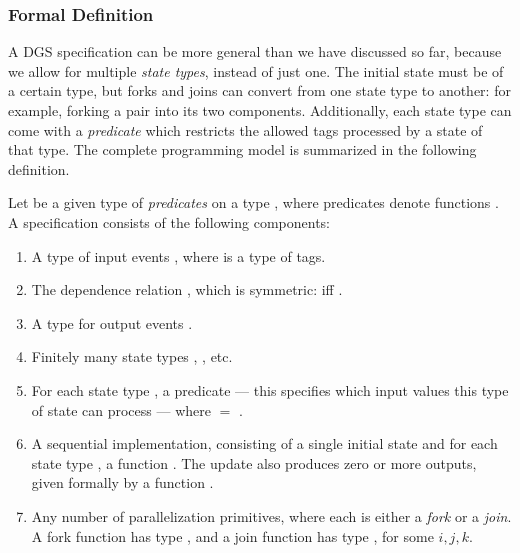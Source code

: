 \subsubsection{Formal Definition}

A DGS specification can be more general than we have discussed so far,
because we allow for multiple \emph{state types}, instead of just
one. The initial state must be of a certain type, but forks and joins
can convert from one state type to another: for example, forking a
pair into its two components.
Additionally,
each state type can come with a \emph{predicate} which restricts
the allowed tags processed by a state of that type.
The complete programming model is summarized in the following
definition.

\begin{definition}
\label{def:prog-model}
Let  be a given type of \emph{predicates}
on a type ,
where predicates denote functions .
A specification consists of the following components:
\begin{enumerate}[(1)]
\item A type of input events ,
where  is a type of tags.
\item The dependence relation ,
which is symmetric: 
iff .
\item A type for output events .
\item Finitely many state types , , etc.
\item For each state type ,
a predicate  --- this specifies which input values this type of state can process --- where  $=$ .
\item A sequential implementation, consisting of a single initial state  and for each state type ,
a function .
The update also produces zero or more outputs, given formally by a function
.
\item Any number of parallelization primitives, where each is either a \emph{fork} or a \emph{join}. A fork function has type
,
and a join function has type
, for some $i, j, k$.
\end{enumerate}
\end{definition}

